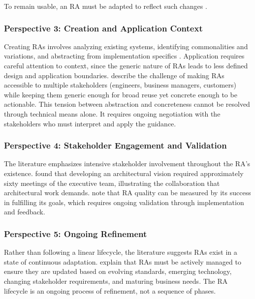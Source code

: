 To remain usable, an RA must be adapted to reflect such changes
\parencite{angelov_framework_2012}.

\subsubsection{Perspective 3: Creation and Application Context}

Creating RAs involves analyzing existing systems, identifying commonalities and
variations, and abstracting from implementation specifics
\parencite{angelov_framework_2012}. Application requires careful attention to
context, since the generic nature of RAs leads to less defined design and
application boundaries. \textcite{cloutier_concept_2010} describe the challenge
of making RAs accessible to multiple stakeholders (engineers, business managers,
customers) while keeping them generic enough for broad reuse yet concrete enough
to be actionable. This tension between abstraction and concreteness cannot be
resolved through technical means alone. It requires ongoing negotiation with the
stakeholders who must interpret and apply the guidance.

\subsubsection{Perspective 4: Stakeholder Engagement and Validation}

The literature emphasizes intensive stakeholder involvement throughout the RA's
existence. \textcite{ross_j_w_maturity_2004} found that developing an
architectural vision required approximately sixty meetings of the executive
team, illustrating the collaboration that architectural work demands.
\textcite{angelov_framework_2012} note that RA quality can be measured by its
success in fulfilling its goals, which requires ongoing validation through
implementation and feedback.

\subsubsection{Perspective 5: Ongoing Refinement}

Rather than following a linear lifecycle, the literature suggests RAs exist in a
state of continuous adaptation. \textcite{cloutier_concept_2010} explain that
RAs must be actively managed to ensure they are updated based on evolving
standards, emerging technology, changing stakeholder requirements, and maturing
business needs. The RA lifecycle is an ongoing process of refinement, not a
sequence of phases.

